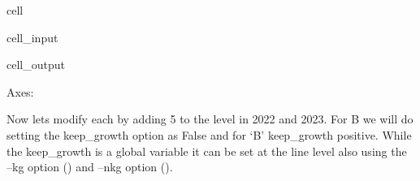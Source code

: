 \documentclass[letterpaper,10pt,english]{jupyterBook}
\begin{document}
\begin{sphinxuseclass}{cell}\begin{sphinxVerbatimInput}

\begin{sphinxuseclass}{cell_input}
\begin{sphinxVerbatim}[commandchars=\\\{\}]
\PYG{p}{[}\PYG{p}{[}\PYG{p}{]}\PYG{p}{]}
\end{sphinxVerbatim}

\end{sphinxuseclass}\end{sphinxVerbatimInput}
\begin{sphinxVerbatimOutput}

\begin{sphinxuseclass}{cell_output}
\begin{sphinxVerbatim}[commandchars=\\\{\}]
\PYGZlt{}Axes: \PYGZgt{}
\end{sphinxVerbatim}

\noindent{}

\end{sphinxuseclass}\end{sphinxVerbatimOutput}

\end{sphinxuseclass}
\sphinxAtStartPar
Now lets modify each by adding 5 to the level in 2022 and 2023.  For B we will do setting the keep\_growth option as False and for ‘B’ keep\_growth positive.  While the keep\_growth is a global variable it can be set at the line level also using the –kg option () and –nkg option ().
\end{document}
